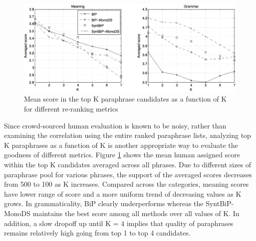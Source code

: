 \documentclass[11pt]{article}
\newcommand{\mnote}[1]{\marginpar{\raggedleft\footnotesize\itshape#1}}
\begin{document}


\mnote{on top K analysis} %

\begin{figure}
\begin{center}
\includegraphics[width=0.8\linewidth]{meanTopK} %
\end{center}
\caption{\small Mean score in the top K paraphrase candidates as a function of K for different re-ranking metrics}
\label{fig_meanTopK}
\end{figure}

Since crowd-sourced human evaluation is known to be noisy, rather than examining the correlation using the entire ranked paraphrase lists, analyzing top K paraphrases as a function of K is another appropriate way to evaluate the goodness of different metrics. Figure \ref{fig_meanTopK} shows the mean human assigned score within the top K candidates averaged across all phrases. Due to different sizes of paraphrase pool for various phrases, the support of the averaged scores decreases from 500 to 100 as K increases. Compared across the categories, meaning scores have lower range of score and a more uniform trend of decreasing values as K grows.  In grammaticality, BiP clearly underperforms whereas the SyntBiP-MonoDS maintains the best score among all methods over all values of K. In addition, a slow dropoff up until K = 4 implies that quality of paraphrases remains relatively high going from top 1 to top 4 candidates.
\end{document}
